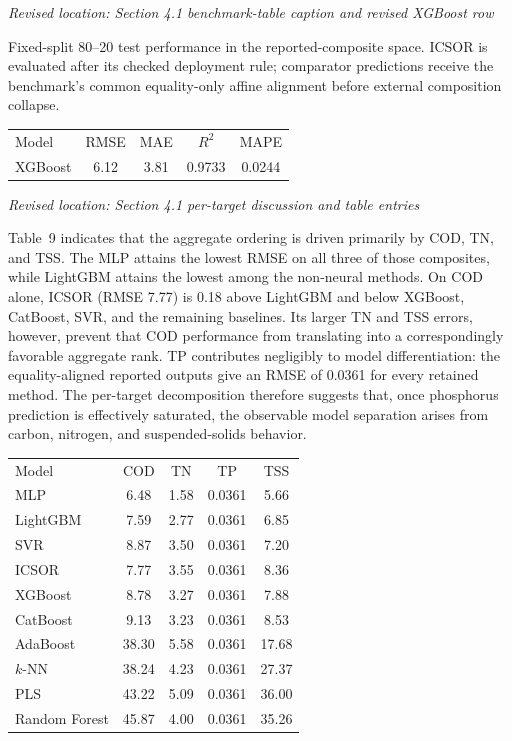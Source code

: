 \documentclass[11pt,a4paper]{article}
\newcommand{\excerptlocation}[1]{\par\noindent\textit{Revised location: #1}\par}
\begin{document}
\excerptlocation{Section 4.1 benchmark-table caption and revised XGBoost row}
\begin{revisionexcerpt}
Fixed-split 80--20 test performance in the reported-composite space. ICSOR is evaluated after its checked deployment rule; comparator predictions receive the benchmark's common equality-only affine alignment before external composition collapse.

\begin{center}
\scriptsize
\begin{tabular}{lcccc}
Model & RMSE & MAE & $R^2$ & MAPE \\
XGBoost & 6.12 & 3.81 & 0.9733 & 0.0244 \\
\end{tabular}
\end{center}
\end{revisionexcerpt}

\excerptlocation{Section 4.1 per-target discussion and table entries}
\begin{revisionexcerpt}
Table~9 indicates that the aggregate ordering is driven primarily by COD, TN, and TSS. The MLP attains the lowest RMSE on all three of those composites, while LightGBM attains the lowest among the non-neural methods. On COD alone, ICSOR (RMSE 7.77) is 0.18 above LightGBM and below XGBoost, CatBoost, SVR, and the remaining baselines. Its larger TN and TSS errors, however, prevent that COD performance from translating into a correspondingly favorable aggregate rank. TP contributes negligibly to model differentiation: the equality-aligned reported outputs give an RMSE of 0.0361 for every retained method. The per-target decomposition therefore suggests that, once phosphorus prediction is effectively saturated, the observable model separation arises from carbon, nitrogen, and suspended-solids behavior.

\begin{center}
\scriptsize
\begin{tabular}{lcccc}
Model & COD & TN & TP & TSS \\
MLP & 6.48 & 1.58 & 0.0361 & 5.66 \\
LightGBM & 7.59 & 2.77 & 0.0361 & 6.85 \\
SVR & 8.87 & 3.50 & 0.0361 & 7.20 \\
ICSOR & 7.77 & 3.55 & 0.0361 & 8.36 \\
XGBoost & 8.78 & 3.27 & 0.0361 & 7.88 \\
CatBoost & 9.13 & 3.23 & 0.0361 & 8.53 \\
AdaBoost & 38.30 & 5.58 & 0.0361 & 17.68 \\
$k$-NN & 38.24 & 4.23 & 0.0361 & 27.37 \\
PLS & 43.22 & 5.09 & 0.0361 & 36.00 \\
Random Forest & 45.87 & 4.00 & 0.0361 & 35.26 \\
\end{tabular}
\end{center}
\end{revisionexcerpt}
\end{document}
